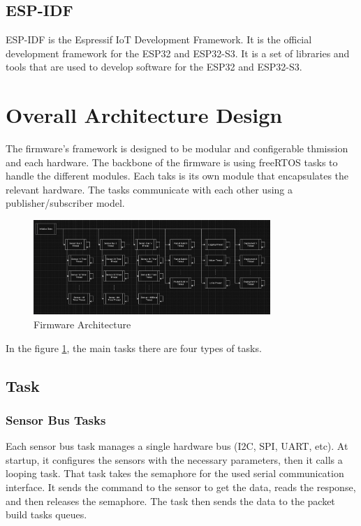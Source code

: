\documentclass{book}
\begin{document}
\subsection{ESP-IDF}
\par ESP-IDF is the Espressif IoT Development Framework. It is the official development framework for the ESP32 and ESP32-S3. It is a set of libraries and tools that are used to develop software for the ESP32 and ESP32-S3.

\section{Overall Architecture Design}
\par The firmware's framework is designed to be modular and configerable thmission and each hardware. The backbone of the firmware is using freeRTOS tasks to handle the different modules. Each taks is its own module that encapsulates the relevant hardware. The tasks communicate with each other using a publisher/subscriber model.

\begin{figure} [H]
    \centering
    \includegraphics[width=0.8\textwidth]{images/firmware-architecture.png}
    \caption{Firmware Architecture}
    \label{fig:firmware-architecture} 
\end{figure}

\par In the figure \ref{fig:firmware-architecture}, the main tasks there are four types of tasks. 
\subsection{Task}
\subsubsection{Sensor Bus Tasks}
\par Each sensor bus task manages a single hardware bus (I2C, SPI, UART, etc). At startup, it configures the sensors with the necessary parameters, then it calls a looping task. That task takes the semaphore for the used serial communication interface. It sends the command to the sensor to get the data, reads the response, and then releases the semaphore. The task then sends the data to the packet build tasks queues.
\end{document}
